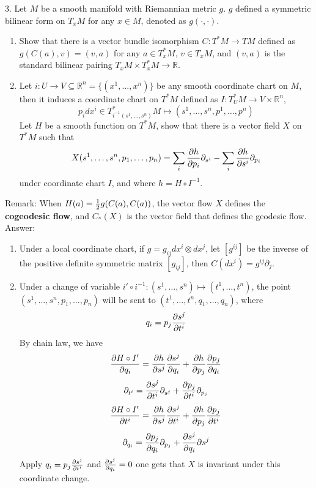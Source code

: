 \documentclass{article}
\theoremstyle{definition}
\begin{document}
3. Let $M$ be a smooth manifold with Riemannian metric $g$. $g$ defined a symmetric bilinear form on $T_xM$ for any $x\in M$, denoted as $g(\cdot, \cdot)$.
\begin{enumerate}
    \item Show that there is a vector bundle isomorphism $C: T^*M\rightarrow TM$ defined as $g(C(a), v)=(v, a)$ for any $a\in T_x^*M$, $v\in T_xM$, and $(v, a)$ is the standard bilinear pairing $T_xM\times T^*_xM\rightarrow\mathbb{R}$.
    \item Let $i: U\rightarrow V\subseteq\mathbb{R}^n=\{(x^1, \dots, x^n)\}$ be any smooth coordinate chart on $M$, then it induces a coordinate chart on $T^*M$ defined as $I: T_U^*M\rightarrow V\times \mathbb{R}^n$,
    \[p_idx^i\in T_{i^{-1}(s^1, \dots, s^n)}^*M\mapsto (s^1, \dots, s^n, p^1, \dots, p^n)\]
    Let $H$ be a smooth function on $T^*M$, show that there is a vector field $X$ on $T^*M$ such that 
    \[X(s^1, \dots, s^n, p_1, \dots, p_n)=\sum_i{\partial h\over \partial p_i}\partial_{s^i}-\sum_i{\partial h\over \partial s^i}\partial_{p_i}\]
    under coordinate chart $I$, and where $h=H\circ I^{-1}$.
\end{enumerate}

Remark: When $H(a)={1\over 2}g(C(a), C(a))$, the vector flow $X$ defines the {\bf cogeodesic flow}, and $C_*(X)$ is the vector field that defines the geodesic flow.\\

Answer: \begin{enumerate}
    \item Under a local coordinate chart, if $g=g_{ij}dx^i\otimes dx^j$, let $[g^{ij}]$ be the inverse of the positive definite symmetric matrix $[g_{ij}]$, then $C(dx^i)=g^{ij}\partial_j$.
    \item Under a change of variable $i'\circ i^{-1}: (s^1, \dots, s^n)\mapsto (t^1, \dots, t^n)$, the point $(s^1, \dots, s^n, p_1, \dots, p_n)$ will be sent to $(t^1, \dots, t^n, q_1, \dots, q_n)$, where 
    \[q_i=p_j{\partial s^j\over \partial t^i}\]
    By chain law, we have
    \[{\partial H\circ I'\over\partial q_i}={\partial h\over\partial s^j}{\partial s^j\over \partial q_i}+{\partial h\over\partial p_j}{\partial p_j\over \partial q_i}\]
    \[\partial_{t^i}={\partial s^j\over \partial t^i}\partial_{s^j}+{\partial p_j\over \partial t^i}\partial_{p_j}\]
    \[{\partial H\circ I'\over \partial t^i}={\partial h\over\partial s^j}{\partial s^j\over \partial t^i}+{\partial h\over\partial p_j}{\partial p_j\over \partial t^i}\]
    \[\partial_{q_i}={\partial p_j\over\partial q_i}\partial_{p_j}+{\partial s^j\over\partial q_i}\partial s^j\]
    Apply $q_i=p_j{\partial s^j\over \partial t^i}$ and ${\partial s^j\over\partial q_i}=0$ one gets that $X$ is invariant under this coordinate change.
\end{enumerate}
\end{document}
